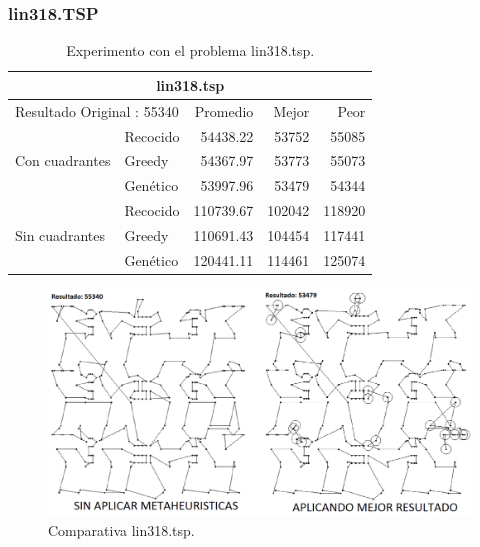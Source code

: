 \subsubsection{lin318.TSP}
\begin{table}[hbtp]
 \centering
    \caption{Experimento con el problema lin318.tsp.} 
	\begin{tabular}{ | l   l | r | r | r |   }
     \hline\multicolumn{5}{|c|}{ \rowcolor[gray]{0.8}lin318.tsp} \\\hline
     \multicolumn{2}{|l|}{Resultado Original : 55340} & Promedio & Mejor & Peor \\ \hline
                & Recocido  & 54438.22 & 53752 & 55085  \\ 
 Con cuadrantes & Greedy    & 54367.97 & 53773 & 55073  \\ 
                & Genético  & \cellcolor[gray]{0.9} 53997.96 & \cellcolor[gray]{0.9} 53479 & \cellcolor[gray]{0.9} 54344  \\ 
                \hline
                & Recocido  & 110739.67 & \cellcolor[gray]{0.9} 102042 & 118920   \\ 
 Sin cuadrantes & Greedy    & \cellcolor[gray]{0.9} 110691.43 & 104454 & \cellcolor[gray]{0.9} 117441   \\ 
                & Genético  & 120441.11 & 114461 & 125074    \\ 
                \hline
    \end{tabular}
    \label{table:EXP_lin318.tsp}
\end{table}
 \begin{figure}[hbtp]
    \centering
        \includegraphics[width=1\textwidth]{PruebasResultados/Experimentos_Comparativas/lin318.png}
        \caption{Comparativa lin318.tsp.}
        \label{fig:lin318_comparativa.png}
\end{figure}
